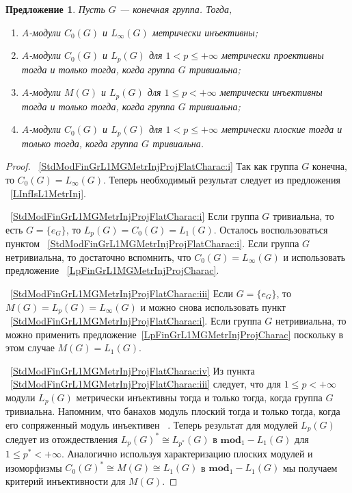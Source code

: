 \documentclass{article}
\numberwithin{equation}{section}
\theoremstyle{plain}
\newtheorem{propos}{Предложение}
\theoremstyle{definition}
\newtheorem{proof}{Доказательство}\def\theproof{}
\newcommand{\isom}{\mathop{\mathbin{\cong}}}
\begin{document}
\begin{fulltext}
\begin{propos}\label{StdModFinGrL1MGMetrInjProjFlatCharac} Пусть $G$ ---
конечная группа. Тогда,
\begin{enumerate}[label = (\roman*)]
    \item $A$-модули $C_0(G)$ и $L_\infty(G)$ метрически
	инъективны;\label{StdModFinGrL1MGMetrInjProjFlatCharac:i}
 
	\item $A$-модули $C_0(G)$ и $L_p(G)$ для $1<p\leq +\infty$ метрически
    проективны тогда и только тогда, когда группа $G$
    тривиальна;\label{StdModFinGrL1MGMetrInjProjFlatCharac:ii}
 
	\item $A$-модули $M(G)$ и $L_p(G)$ для $1\leq p< +\infty$ метрически
    инъективны тогда и только тогда, когда группа $G$
    тривиальна;\label{StdModFinGrL1MGMetrInjProjFlatCharac:iii}
 
	\item $A$-модули $C_0(G)$ и $L_p(G)$ для $1<p\leq +\infty$ метрически
    плоские тогда и только тогда, когда группа $G$
    тривиальна.\label{StdModFinGrL1MGMetrInjProjFlatCharac:iv}
\end{enumerate}
\end{propos}
\begin{proof}
~\ref{StdModFinGrL1MGMetrInjProjFlatCharac:i} Так как группа $G$ конечна, то
$C_0(G)=L_\infty(G)$. Теперь необходимый результат следует из предложения
~\ref{LInfIsL1MetrInj}.

~\ref{StdModFinGrL1MGMetrInjProjFlatCharac:i} Если группа $G$ тривиальна, то
есть $G=\{e_G\}$, то $L_p(G)=C_0(G)=L_1(G)$. Осталось воспользоваться пунктом
~\ref{StdModFinGrL1MGMetrInjProjFlatCharac:i}. Если группа $G$ нетривиальна, то
достаточно вспомнить, что $C_0(G)=L_\infty(G)$ и использовать предложение
~\ref{LpFinGrL1MGMetrInjProjCharac}.

~\ref{StdModFinGrL1MGMetrInjProjFlatCharac:iii} Если $G=\{e_G\}$, то
$M(G)=L_p(G)=L_\infty(G)$ и можно снова использовать пункт
~\ref{StdModFinGrL1MGMetrInjProjFlatCharac:i}. Если группа $G$ нетривиальна, то
можно применить предложение~\ref{LpFinGrL1MGMetrInjProjCharac} поскольку в этом
случае $M(G)=L_1(G)$.

~\ref{StdModFinGrL1MGMetrInjProjFlatCharac:iv} Из пункта
~\ref{StdModFinGrL1MGMetrInjProjFlatCharac:iii} следует, что для $1\leq
p<+\infty$ модули $L_p(G)$ метрически инъективны тогда и только тогда, когда
группа $G$ тривиальна. Напомним, что банахов модуль плоский тогда и только
тогда, когда его сопряженный модуль инъективен
~\cite[предложение~2.21]{NemGeomProjInjFlatBanMod}. Теперь результат для модулей
$L_p(G)$ следует из отождествления ${L_p(G)}^*\isom L_{p^*}(G)$ в
$\mathbf{mod}_1-L_1(G)$ для $1\leq p^*< +\infty$. Аналогично используя
характеризацию плоских модулей и изоморфизмы ${C_0(G)}^*\isom M(G)\isom L_1(G)$
в $\mathbf{mod}_1-L_1(G)$ мы получаем критерий инъективности для $M(G)$.
\end{proof}


\end{fulltext}
\end{document}
